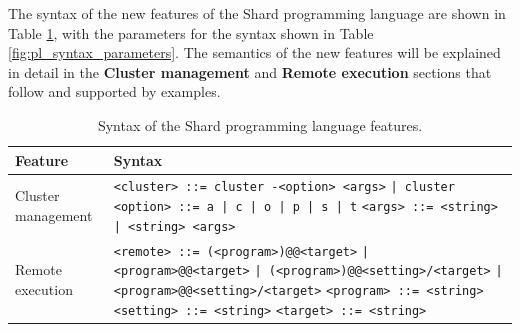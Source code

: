 \documentclass[twoside]{report}
\begin{document}
The syntax of the new features of the Shard programming language are shown in Table \ref{fig:pl_syntax}, with the parameters for the syntax shown in Table \ref{fig:pl_syntax_parameters}.
The semantics of the new features will be explained in detail in the \textbf{Cluster management} and \textbf{Remote execution} sections that follow and supported by examples.

\vspace{4cm}

\begin{table}
  \begin{center}
    \begin{tabularx}{\textwidth}{|l|X|}
      \hline
      Feature            & Syntax                                                   \\ \hline
      Cluster management & \texttt{<cluster> ::= cluster -<option> <args>} \newline
      \texttt{| cluster} \newline
      \texttt{<option> ::= a | c | o | p | s | t} \newline
      \texttt{<args> ::= <string>} \newline
      \texttt{| <string> <args>}
      \\ \hline
      Remote execution   &
      \texttt{<remote> ::= (<program>)@@<target>}
      \newline \texttt{| <program>@@<target>}
      \newline \texttt{| (<program>)@@<setting>/<target>}
      \newline \texttt{| <program>@@<setting>/<target>} \newline
      \texttt{<program> ::= <string>} \newline
      \texttt{<setting> ::= <string>} \newline
      \texttt{<target> ::= <string>}
      \\ \hline
    \end{tabularx}
    \caption{Syntax of the Shard programming language features.}
    \label{fig:pl_syntax}
  \end{center}
\end{table}
\end{document}
